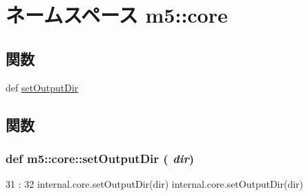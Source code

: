 \hypertarget{namespacem5_1_1core}{
\section{ネームスペース m5::core}
\label{namespacem5_1_1core}
}
\subsection*{関数}
\begin{DoxyCompactItemize}
\item 
def \hyperlink{namespacem5_1_1core_a4c80bea16fff70ecc453f48fcbdcb3ce}{setOutputDir}
\end{DoxyCompactItemize}


\subsection{関数}
\hypertarget{namespacem5_1_1core_a4c80bea16fff70ecc453f48fcbdcb3ce}{
\subsubsection[{setOutputDir}]{\setlength{\rightskip}{0pt plus 5cm}def m5::core::setOutputDir ( {\em dir})}}
\label{namespacem5_1_1core_a4c80bea16fff70ecc453f48fcbdcb3ce}



\begin{DoxyCode}
31                      :
32     internal.core.setOutputDir(dir)
    internal.core.setOutputDir(dir)
\end{DoxyCode}
